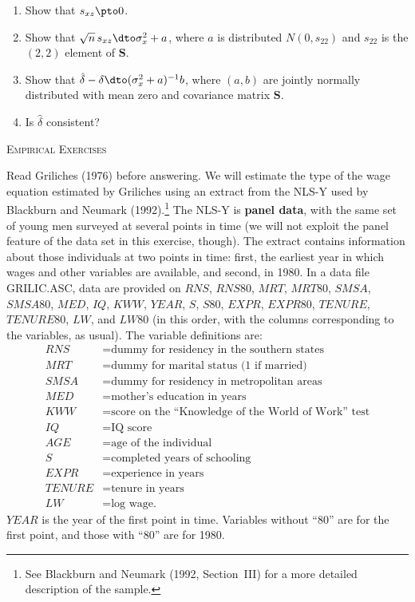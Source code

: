 \begin{problemset}
\begin{enumerate}[label=(\alph*),resume]
\item Show that $s_{xz} \pto 0$.

\item Show that $\sqrt{n}\, s_{xz} \dto \sigma_x^2 + a$, where $a$ is distributed
  $N(0, s_{22})$ and $s_{22}$ is the $(2,2)$ element of $\mathbf{S}$.

\item Show that $\hat{\delta} - \delta \dto (\sigma_x^2 + a)^{-1} b$, where $(a, b)$ are
  jointly normally distributed with mean zero and covariance matrix $\mathbf{S}$.

\item Is $\hat{\delta}$ consistent?
\end{enumerate}

\bigskip
\noindent\textsc{Empirical Exercises}
\bigskip

Read Griliches (1976) before answering.  We will estimate the type of the wage
equation estimated by Griliches using an extract from the NLS-Y used by Blackburn
and Neumark (1992).\footnote{See Blackburn and Neumark (1992, Section~III) for a more
detailed description of the sample.}  The NLS-Y is \textbf{panel data}, with the same set of
young men surveyed at several points in time (we will not exploit the panel feature of the
data set in this exercise, though).  The extract contains information about those
individuals at two points in time: first, the earliest year in which wages and other
variables are available, and second, in 1980.  In a data file GRILIC.ASC, data are
provided on $RNS$, $RNS80$, $MRT$, $MRT80$, $SMSA$, $SMSA80$, $MED$, $IQ$, $KWW$,
$YEAR$, $S$, $S80$, $EXPR$, $EXPR80$, $TENURE$, $TENURE80$, $LW$, and $LW80$ (in
this order, with the columns corresponding to the variables, as usual).  The variable
definitions are:
\begin{align*}
  RNS &= \text{dummy for residency in the southern states} \\
  MRT &= \text{dummy for marital status (1 if married)} \\
  SMSA &= \text{dummy for residency in metropolitan areas} \\
  MED &= \text{mother's education in years} \\
  KWW &= \text{score on the ``Knowledge of the World of Work'' test} \\
  IQ &= \text{IQ score} \\
  AGE &= \text{age of the individual} \\
  S &= \text{completed years of schooling} \\
  EXPR &= \text{experience in years} \\
  TENURE &= \text{tenure in years} \\
  LW &= \text{log wage.}
\end{align*}
$YEAR$ is the year of the first point in time.  Variables without ``80'' are for the first
point, and those with ``80'' are for 1980.


\end{problemset}
